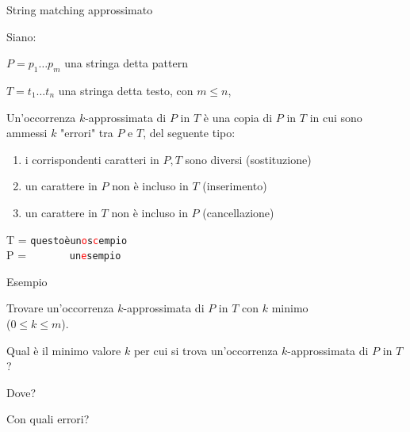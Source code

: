 \begin{frame}{String matching approssimato}

\vspace{-9pt}
\begin{myboxtitle}[Definizione]

Siano:
\BI
\item $P = p_1 \ldots p_m$ una stringa detta \alert{pattern}
\item $T = t_1 \ldots t_n$ una stringa detta \alert{testo}, con $m \leq n$,
\EI

Un'\alert{occorrenza $k$-approssimata} di $P$ in $T$ è una copia di $P$ in $T$ in cui sono ammessi $k$ "errori" tra $P$ e $T$, del seguente tipo:
\begin{enumerate}
\item i corrispondenti caratteri in $P, T$ sono diversi (\alert{sostituzione}) 
\item un carattere in $P$ non è incluso in $T$ (\alert{inserimento})
\item un carattere in $T$ non è incluso in $P$ (\alert{cancellazione})
\end{enumerate}
\end{myboxtitle}

\begin{myboxtitle}[Esempio]
T = \texttt{questoèun\textcolor{red}{o}s\textcolor{red}{c}empio} \\
P = \texttt{~~~~~~~un\textcolor{red}{e}sempio}
\end{myboxtitle}

\end{frame}

\begin{frame}{Esempio}

\vspace{-9pt}
\begin{myboxtitle}
Trovare un'occorrenza $k$-approssimata di $P$ in $T$ con $k$ minimo\\ 
($0 \leq k \leq m$).
\end{myboxtitle}

\begin{myboxtitle}[Spiegazione]
\BIL
\item Qual è il minimo valore $k$ per cui si trova un'occorrenza $k$-approssimata di $P$ in $T$?
\item Dove?
\item Con quali errori?
\EIL
\end{myboxtitle}

\end{frame}

